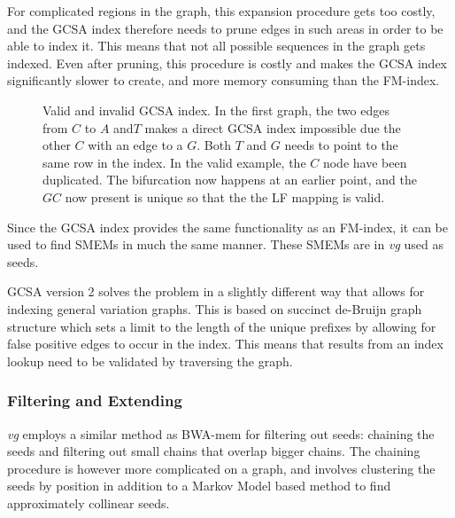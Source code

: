 For complicated regions in the graph, this expansion procedure gets too costly, and the GCSA index therefore needs to prune edges in such areas in order to be able to index it.
This means that not all possible sequences in the graph gets indexed. 
Even after pruning, this procedure is costly and makes the GCSA index significantly slower to create, and more memory consuming than the FM-index.

\begin{figure}
  \tikzpicture
  
  \endtikzpicture
  \caption{
    Valid and invalid GCSA index.
    In the first graph, the two edges from $C$ to $A$ and$T$ makes a direct GCSA index impossible due the other $C$ with an edge to a $G$.
    Both $T$ and $G$ needs to point to the same row in the index.
    In the valid example, the $C$ node have been duplicated.
    The bifurcation now happens at an earlier point, and the $GC$ now present is unique so that the the LF mapping is valid.}
    \label{fig:gcsa}
\end{figure}

Since the GCSA index provides the same functionality as an FM-index, it can be used to find SMEMs in much the same manner. These SMEMs are in \emph{vg} used as seeds. 

GCSA version 2 solves the problem in a slightly different way that allows for indexing general variation graphs.
This is based on succinct de-Bruijn graph~\cite{succinctdebruijn} structure which sets a limit to the length of the unique prefixes by allowing for false positive edges to occur in the index.
This means that results from an index lookup need to be validated by traversing the graph. 

\subsubsection{Filtering and Extending}
\emph{vg} employs a similar method as BWA-mem for filtering out seeds: chaining the seeds and filtering out small chains that overlap bigger chains.
The chaining procedure is however more complicated on a graph, and involves clustering the seeds by position in addition to a Markov Model based method to find approximately collinear seeds. 

